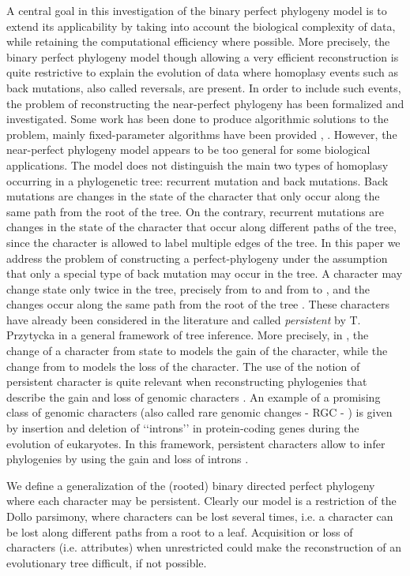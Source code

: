 \documentclass{llncs}
\begin{document}
A central goal in this investigation  of the binary perfect phylogeny model is to extend its applicability by taking into account the biological complexity of  data, while retaining  the computational efficiency where possible. More precisely, the binary perfect phylogeny model though allowing a very efficient reconstruction is quite restrictive to explain the evolution of data where   homoplasy events such as back mutations, also called reversals,  are present.  In order to include such events,   the problem of reconstructing the near-perfect phylogeny    has been formalized and investigated.  Some work has been done to produce algorithmic  solutions to the problem, mainly fixed-parameter algorithms have been provided \cite{near-perfect2}, \cite{near-perfect1}.
However,  the near-perfect phylogeny   model appears to be too general for some biological applications.  The model  does not distinguish the main two types of homoplasy occurring in a phylogenetic tree: recurrent mutation  and back mutations.    Back mutations are changes in the  state of the character that only occur along the same path from the root of the tree. On the contrary,  recurrent mutations are changes  in the  state of  the  character  that occur  along different paths of the tree, since the character is allowed to label multiple edges of the tree. In this paper we address the problem of constructing a perfect-phylogeny under the assumption that  only a special type of back mutation  may occur in the tree. A character may change state only twice in the tree,  precisely from  to  and from  to ,  and the changes occur along the same path from the root of the tree . These characters have  already been considered in the literature  and called {\em persistent}  by T. Przytycka \cite{Pr06} in a general framework of tree inference.  More precisely,  in  \cite{Pr06},  the change of a character from state  to  models the gain of  the character, while the change from  to  models the loss of the character.  
The use of the notion of persistent character is quite relevant when reconstructing phylogenies that describe the gain and loss of genomic characters \cite{zeng}.  An example of a promising class of genomic characters (also called rare genomic changes - RGC - ) is given by  insertion and deletion  of ‘‘introns’’ in protein-coding genes during the evolution of eukaryotes. In this framework,   persistent characters allow to infer phylogenies by using the gain and loss of introns \cite{zeng}. 

We define a generalization of the (rooted) binary directed perfect phylogeny  where each character may be persistent.   Clearly our model is a restriction of the Dollo parsimony,  where characters can be lost several times, i.e. a character can be lost along different paths from a root to a leaf. Acquisition or loss of characters (i.e. attributes) when
unrestricted could make  the reconstruction of an  evolutionary tree difficult, if not possible.
\end{document}

